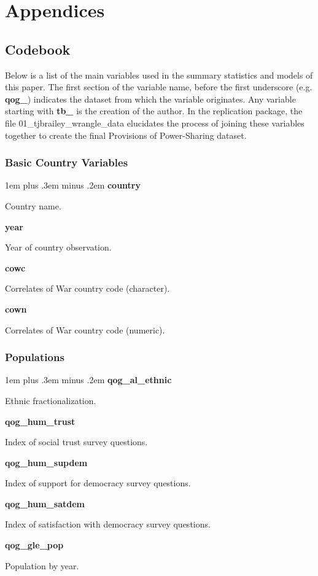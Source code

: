 \documentclass[12pt]{article}
\begin{document}
\nocite{*}



\pagebreak

\section{Appendices}
\subsection{Codebook}

Below is a list of the main variables used in the summary statistics and models of this paper. The first section of the variable name, before the first underscore (e.g. \textbf{qog\_}) indicates the dataset from which the variable originates. Any variable starting with \textbf{tb\_} is the creation of the author. In the replication package, the file 01\_tjbrailey\_wrangle\_data elucidates the process of joining these variables together to create the final Provisions of Power-Sharing dataset.  

\newlength\cbl
\newenvironment{codebook}[1][rob\_avprison1]{
	\settowidth{\cbl}{#1}
	\parskip1em plus .3em minus .2em
	\parindent0pt
	\def\code##1##2{{\bfseries ##1}\hfill
		\parbox[t]{\dimexpr\linewidth-15em-\cbl}{##2}\par}}{\noindent}

\singlespacing

\subsubsection{Basic Country Variables}
	
\begin{codebook}
	\code{country}{Country name.}
	\code{year}{Year of country observation.}
	\code{cowc}{Correlates of War country code (character).}
	\code{cown}{Correlates of War country code (numeric).}
\end{codebook}

\subsubsection{Populations}

\begin{codebook}
	\code{qog\_al\_ethnic}{Ethnic fractionalization.}
	\code{qog\_hum\_trust}{Index of social trust survey questions.}
	\code{qog\_hum\_supdem}{Index of support for democracy survey questions.}
	\code{qog\_hum\_satdem}{Index of satisfaction with democracy survey questions.}
	\code{qog\_gle\_pop}{Population by year.}
\end{codebook}
\end{document}

